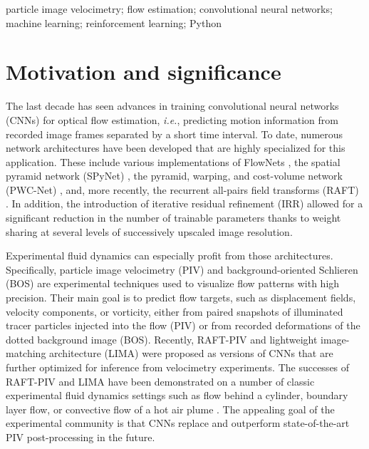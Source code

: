 \documentclass[a4paper,fleqn]{cas-dc}
\begin{document}
\begin{keywords}
particle image velocimetry; flow estimation; convolutional neural networks; machine learning; reinforcement learning; Python
\end{keywords}

\maketitle

\section{Motivation and significance\label{sec:introduction}}

The last decade has seen advances in training convolutional neural networks (CNNs) for optical flow estimation, \textit{i.e.}, predicting motion information from recorded image frames separated by a short time interval. To date, numerous network architectures have been developed that are highly specialized for this application. These include various implementations of FlowNets \citep{dosovitskiy2015flownet, ilg2017flownet, hui2018liteflownet}, the spatial pyramid network (SPyNet) \cite{ranjan2017optical}, the pyramid, warping, and cost-volume network (PWC-Net) \cite{sun2018pwc}, and, more recently, the recurrent all-pairs field transforms (RAFT) \cite{teed2020raft}. In addition, the introduction of iterative residual refinement (IRR) \cite{hur2019iterative} allowed for a significant reduction in the number of trainable parameters thanks to weight sharing at several levels of successively upscaled image resolution.

Experimental fluid dynamics can especially profit from those architectures. Specifically, particle image velocimetry (PIV) and background-oriented Schlieren (BOS) are experimental techniques used to visualize flow patterns with high precision. Their main goal is to predict flow targets, such as displacement fields, velocity components, or vorticity, either from paired snapshots of illuminated tracer particles injected into the flow (PIV) or from recorded deformations of the dotted background image (BOS). Recently, RAFT-PIV \cite{lagemann2021deep} and lightweight image-matching architecture (LIMA) \citep{manickathan2023lightweight} were proposed as versions of CNNs that are further optimized for inference from velocimetry experiments. The successes of RAFT-PIV and LIMA have been demonstrated on a number of classic experimental fluid dynamics settings such as flow behind a cylinder, boundary layer flow, or convective flow of a hot air plume \cite{mucignat2023lightweight}. The appealing goal of the experimental community is that CNNs replace and outperform state-of-the-art PIV post-processing in the future. %
\end{document}
